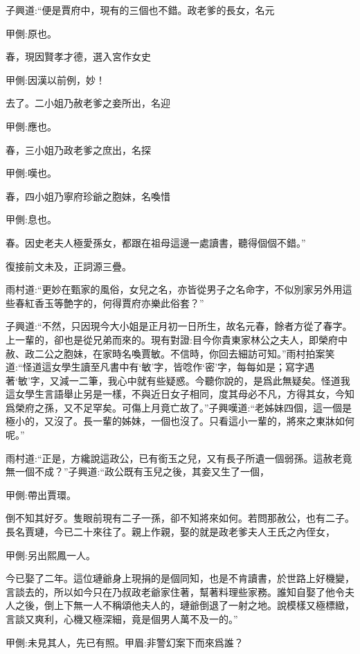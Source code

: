 \begin{parag}
    子興道:“便是賈府中，現有的三個也不錯。政老爹的長女，名元\begin{note}甲側:原也。\end{note}春，現因賢孝才德，選入宮作女史\begin{note}甲側:因漢以前例，妙！\end{note}去了。二小姐乃赦老爹之妾所出，名迎\begin{note}甲側:應也。\end{note}春，三小姐乃政老爹之庶出，名探\begin{note}甲側:嘆也。\end{note}春，四小姐乃寧府珍爺之胞妹，名喚惜\begin{note}甲側:息也。\end{note}春。因史老夫人極愛孫女，都跟在祖母這邊一處讀書，聽得個個不錯。”\begin{note}復接前文未及，正詞源三疊。\end{note}雨村道:“更妙在甄家的風俗，女兒之名，亦皆從男子之名命字，不似別家另外用這些春紅香玉等艶字的，何得賈府亦樂此俗套？”
\end{parag}


\begin{parag}
    子興道:“不然，只因現今大小姐是正月初一日所生，故名元春，餘者方從了春字。上一輩的，卻也是從兄弟而來的。現有對證:目今你貴東家林公之夫人，即榮府中赦、政二公之胞妹，在家時名喚賈敏。不信時，你回去細訪可知。”雨村拍案笑道:“怪道這女學生讀至凡書中有‘敏’字，皆唸作‘密’字，每每如是；寫字遇著‘敏’字，又減一二筆，我心中就有些疑惑。今聽你說的，是爲此無疑矣。怪道我這女學生言語舉止另是一樣，不與近日女子相同，度其母必不凡，方得其女，今知爲榮府之孫，又不足罕矣。可傷上月竟亡故了。”子興嘆道:“老姊妹四個，這一個是極小的，又沒了。長一輩的姊妹，一個也沒了。只看這小一輩的，將來之東牀如何呢。”
\end{parag}


\begin{parag}
    雨村道:“正是，方纔說這政公，已有銜玉之兒，又有長子所遺一個弱孫。這赦老竟無一個不成？”子興道:“政公既有玉兒之後，其妾又生了一個，\begin{note}甲側:帶出賈環。\end{note}倒不知其好歹。隻眼前現有二子一孫，卻不知將來如何。若問那赦公，也有二子。長名賈璉，今已二十來往了。親上作親，娶的就是政老爹夫人王氏之內侄女，\begin{note}甲側:另出熙鳳一人。\end{note}今已娶了二年。這位璉爺身上現捐的是個同知，也是不肯讀書，於世路上好機變，言談去的，所以如今只在乃叔政老爺家住著，幫著料理些家務。誰知自娶了他令夫人之後，倒上下無一人不稱頌他夫人的，璉爺倒退了一射之地。說模樣又極標緻，言談又爽利，心機又極深細，竟是個男人萬不及一的。”\begin{note}甲側:未見其人，先已有照。甲眉:非警幻案下而來爲誰？\end{note}
\end{parag}


